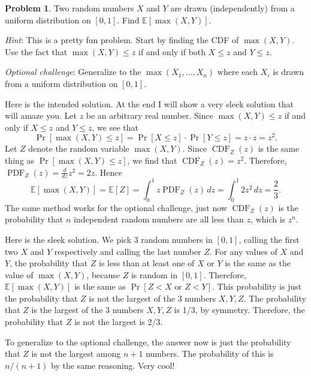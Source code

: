 \documentclass[11pt,oneside]{amsart}
\theoremstyle{definition}
\newtheorem{problem}{Problem}
\newcommand{\bE}{\mathbb{E}}
\DeclareMathOperator{\CDF}{CDF}
\DeclareMathOperator{\PDF}{PDF}
\begin{document}
    \begin{problem}
        Two random numbers $X$ and $Y$ are drawn (independently) from a uniform distribution on $[0,1]$. Find $\bE[\max(X,Y)]$.

        \emph{Hint}: This is a pretty fun problem. Start by finding the CDF of $\max(X,Y)$. Use the fact that $\max(X,Y)\leq z$ if and only if both $X\leq z$ and $Y\leq z$.

        \emph{Optional challenge}: Generalize to the $\max(X_1,\dots,X_n)$ where each $X_i$ is drawn from a uniform distribution on $[0,1]$.
    \end{problem}
    \begin{solution}
        Here is the intended solution. At the end I will show a very sleek solution that will amaze you. Let $z$ be an arbitrary real number. Since $\max(X,Y)\leq z$ if and only if $X\leq z$ and $Y\leq z$, we see that
        \[\Pr[\max(X,Y)\leq z]=\Pr[X\leq z]\cdot\Pr[Y\leq z]=z\cdot z=z^2.\]
        Let $Z$ denote the random variable $\max(X,Y)$. Since $\CDF_Z(z)$ is the same thing as $\Pr[\max(X,Y)\leq z]$, we find that $\CDF_Z(z)=z^2$. Therefore, $\PDF_Z(z)=\frac d{dz}z^2=2z$. Hence
        \[\bE[\max(X,Y)]=\bE[Z]=\int_0^1 z\PDF_Z(z)\,dz=\int_0^1 2z^2\,dz=\frac 23.\]
        The same method works for the optional challenge, just now $\CDF_Z(z)$ is the probability that $n$ independent random numbers are all less than $z$, which is $z^n$.
    \end{solution}
    \begin{solution}
        Here is the sleek solution. We pick 3 random numbers in $[0,1]$, calling the first two $X$ and $Y$ respectively and calling the last number $Z$. For any values of $X$ and $Y$, the probability that $Z$ is less than at least one of $X$ or $Y$ is the same as the value of $\max(X,Y)$, because $Z$ is random in $[0,1]$. Therefore, $\bE[\max(X,Y)]$ is the same as $\Pr[Z< X\text{ or }Z< Y]$. This probability is just the probability that $Z$ is not the largest of the 3 numbers $X,Y,Z$. The probability that $Z$ is the largest of the 3 numbers $X,Y,Z$ is 1/3, by symmetry. Therefore, the probability that $Z$ is not the largest is 2/3.

        To generalize to the optional challenge, the answer now is just the probability that $Z$ is not the largest among $n+1$ numbers. The probability of this is $n/(n+1)$ by the same reasoning. Very cool!
    \end{solution}

\end{document}
